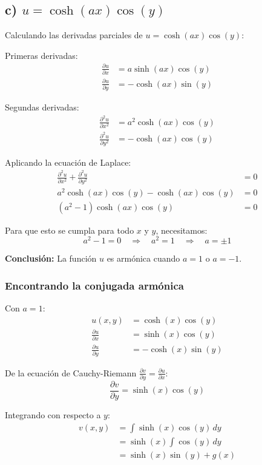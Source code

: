 \documentclass{article}
\begin{document}
\subsection*{c) $u = \cosh(ax)\cos(y)$}

Calculando las derivadas parciales de $u = \cosh(ax)\cos(y)$:

Primeras derivadas:
\begin{align*}
\frac{\partial u}{\partial x} &= a\sinh(ax)\cos(y) \\
\frac{\partial u}{\partial y} &= -\cosh(ax)\sin(y)
\end{align*}

Segundas derivadas:
\begin{align*}
\frac{\partial^2 u}{\partial x^2} &= a^2\cosh(ax)\cos(y) \\
\frac{\partial^2 u}{\partial y^2} &= -\cosh(ax)\cos(y)
\end{align*}

Aplicando la ecuación de Laplace:
\begin{align*}
\frac{\partial^2 u}{\partial x^2} + \frac{\partial^2 u}{\partial y^2} &= 0 \\
a^2\cosh(ax)\cos(y) - \cosh(ax)\cos(y) &= 0 \\
(a^2 - 1)\cosh(ax)\cos(y) &= 0
\end{align*}

Para que esto se cumpla para todo $x$ y $y$, necesitamos:
$$a^2 - 1 = 0 \quad \Rightarrow \quad a^2 = 1 \quad \Rightarrow \quad a = \pm 1$$

\textbf{Conclusión:} La función $u$ es armónica cuando $a = 1$ o $a = -1$.

\subsubsection*{Encontrando la conjugada armónica}

Con $a = 1$:
\begin{align*}
u(x,y) &= \cosh(x)\cos(y) \\
\frac{\partial u}{\partial x} &= \sinh(x)\cos(y) \\
\frac{\partial u}{\partial y} &= -\cosh(x)\sin(y)
\end{align*}

De la ecuación de Cauchy-Riemann $\frac{\partial v}{\partial y} = \frac{\partial u}{\partial x}$:
$$\frac{\partial v}{\partial y} = \sinh(x)\cos(y)$$

Integrando con respecto a $y$:
\begin{align*}
v(x,y) &= \int \sinh(x)\cos(y) \, dy \\
       &= \sinh(x) \int \cos(y) \, dy \\
       &= \sinh(x)\sin(y) + g(x)
\end{align*}
\end{document}
